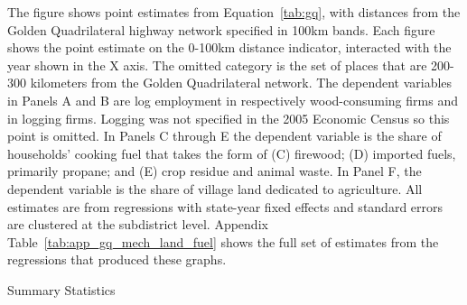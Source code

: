 \footnotesize{The figure shows point estimates from
  Equation~\ref{tab:gq}, with distances from the Golden Quadrilateral
  highway network specified in 100km bands. Each figure shows the
  point estimate on the 0-100km distance indicator, interacted with
  the year shown in the X axis. The omitted category is the set of
  places that are 200-300 kilometers from the Golden Quadrilateral
  network. The dependent variables in Panels A and B are log
  employment in respectively wood-consuming firms and in logging
  firms. Logging was not specified in the 2005 Economic Census so this
  point is omitted. In Panels C through E the dependent variable is
  the share of households' cooking fuel that takes the form of (C)
  firewood; (D) imported fuels, primarily propane; and (E) crop
  residue and animal waste. In Panel F, the dependent variable is the
  share of village land dedicated to agriculture.  All estimates are
  from regressions with state-year fixed effects and standard errors
  are clustered at the subdistrict level. Appendix
  Table~\ref{tab:app_gq_mech_land_fuel} shows the full set of
  estimates from the regressions that produced these graphs.}


  \begin{table}[H]
    \caption{Summary Statistics}
    \newcommand{\tablenote}{
      The table shows summary statistics for the samples used for
      village- and subdistrict-level analyses. Road completion year is shown
    only for villages that received new roads between 2001 and
    2011. The sample for the first four village-level variables
    consists of the set of villages that did not have a road at
    baseline. The sample for agricultural land and energy shares
    consists of all villages with non-zero forest cover at baseline.}
    
    \label{tab:summary}
  \end{table}

